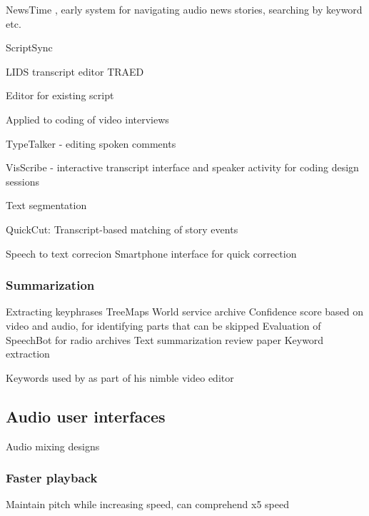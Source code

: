 NewsTime \citep{Horner1993}, early system for navigating audio news stories, searching by keyword etc.

ScriptSync \citep{Avid2011}

LIDS transcript editor \citep{Apperley2002}
TRAED \citep{Masoodian2006}

Editor for existing script \citep{Shin2016}

Applied to coding of video interviews \cite{Chandrasegaran2017}

TypeTalker - editing spoken comments \citep{Arawjo2017}

VisScribe - interactive transcript interface and speaker activity for coding design sessions \cite{Chandrasegaran2017}

Text segmentation \citep{Choi2000}

QuickCut: Transcript-based matching of story events \citep{Truong2016}

Speech to text correcion 
\citep{Burke2006}
\citep{Liang2014}
\citep{Suhm2001}
\citep{Wald2007}
Smartphone interface for quick correction \citep{Liang2014}

\subsubsection{Summarization}

Extracting keyphrases \citep{Inkpen2004}
TreeMaps \citep{Abdulhamid2013,Abdulhamid2013a}
World service archive \citep{Raimond2014}
Confidence score based on video and audio, for identifying parts that can be skipped \citep{Foote1998}
Evaluation of SpeechBot for radio archives \citep{Kim2003}
Text summarization review paper \citep{Lloret2012}
Keyword extraction \citep{Matsuo2004}

Keywords used by \citet{Loviscach2011a} as part of his nimble video editor

\subsection{Audio user interfaces}

Audio mixing designs \citep{Dewey2016,Dewey2016a}

\subsubsection{Faster playback}

Maintain pitch while increasing speed, can comprehend x5 speed \citep{Imai2001}

